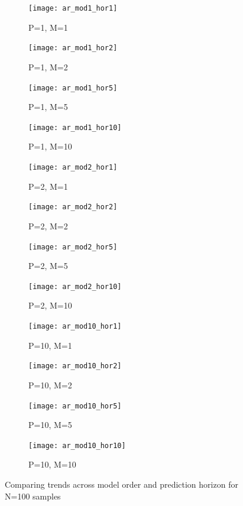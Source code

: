 \begin{figure}[h!]
\centering
\begin{subfigure}{0.24\textwidth}
\centering
\texttt{[image: ar\_mod1\_hor1]}
\caption{P=1, M=1}
\label{fig:ar_mod1_hor1}
\end{subfigure}
\begin{subfigure}{0.24\textwidth}
\centering
\texttt{[image: ar\_mod1\_hor2]}
\caption{P=1, M=2}
\label{fig:ar_mod1_hor2}
\end{subfigure}
\begin{subfigure}{0.24\textwidth}
\centering
\texttt{[image: ar\_mod1\_hor5]}
\caption{P=1, M=5}
\label{fig:ar_mod1_hor5}
\end{subfigure}
\begin{subfigure}{0.24\textwidth}
\centering
\texttt{[image: ar\_mod1\_hor10]}
\caption{P=1, M=10}
\label{fig:ar_mod1_hor10}
\end{subfigure}
\begin{subfigure}{0.24\textwidth}
\centering
\texttt{[image: ar\_mod2\_hor1]}
\caption{P=2, M=1}
\label{fig:ar_mod2_hor1}
\end{subfigure}
\begin{subfigure}{0.24\textwidth}
\centering
\texttt{[image: ar\_mod2\_hor2]}
\caption{P=2, M=2}
\label{fig:ar_mod2_hor2}
\end{subfigure}
\begin{subfigure}{0.24\textwidth}
\centering
\texttt{[image: ar\_mod2\_hor5]}
\caption{P=2, M=5}
\label{fig:ar_mod2_hor5}
\end{subfigure}
\begin{subfigure}{0.24\textwidth}
\centering
\texttt{[image: ar\_mod2\_hor10]}
\caption{P=2, M=10}
\label{fig:ar_mod2_hor10}
\end{subfigure}
\begin{subfigure}{0.24\textwidth}
\centering
\texttt{[image: ar\_mod10\_hor1]}
\caption{P=10, M=1}
\label{fig:ar_mod10_hor1}
\end{subfigure}
\begin{subfigure}{0.24\textwidth}
\centering
\texttt{[image: ar\_mod10\_hor2]}
\caption{P=10, M=2}
\label{fig:ar_mod10_hor2}
\end{subfigure}
\begin{subfigure}{0.24\textwidth}
\centering
\texttt{[image: ar\_mod10\_hor5]}
\caption{P=10, M=5}
\label{fig:ar_mod10_hor5}
\end{subfigure}
\begin{subfigure}{0.24\textwidth}
\centering
\texttt{[image: ar\_mod10\_hor10]}
\caption{P=10, M=10}
\label{fig:ar_mod10_hor10}
\end{subfigure}
\caption{Comparing trends across model order and prediction horizon for N=100 samples}
\label{fig:ar_mod_hor}
\end{figure}




